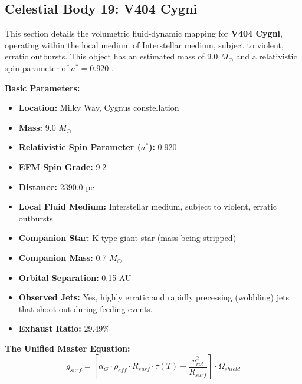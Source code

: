 \documentclass[11pt, a4paper]{article}
\begin{document}
\clearpage
\subsection{Celestial Body 19: V404 Cygni}
This section details the volumetric fluid-dynamic mapping for \textbf{V404 Cygni}, operating within the local medium of Interstellar medium, subject to violent, erratic outbursts. This object has an estimated mass of 9.0 $M_{\odot}$ and a relativistic spin parameter of $a^* = 0.920$ \cite{miller-jones2015, simbad}.

\vspace{0.5em}
\noindent \textbf{Basic Parameters:}
\begin{itemize}
  \item \textbf{Location:} Milky Way, Cygnus constellation
  \item \textbf{Mass:} 9.0 $M_{\odot}$
  \item \textbf{Relativistic Spin Parameter ($a^*$):} 0.920
  \item \textbf{EFM Spin Grade:} 9.2
  \item \textbf{Distance:} 2390.0 pc
  \item \textbf{Local Fluid Medium:} Interstellar medium, subject to violent, erratic outbursts
  \item \textbf{Companion Star:} K-type giant star (mass being stripped)
  \item \textbf{Companion Mass:} 0.7 $M_{\odot}$
  \item \textbf{Orbital Separation:} 0.15 AU
  \item \textbf{Observed Jets:} Yes, highly erratic and rapidly precessing (wobbling) jets that shoot out during feeding events.
  \item \textbf{Exhaust Ratio:} 29.49\%
\end{itemize}

\vspace{0.5em}
\noindent \textbf{The Unified Master Equation:}
$$ g_{surf} = \left[ \alpha_G \cdot \rho_{eff} \cdot R_{surf} \cdot \tau(T) - \frac{v_{rot}^2}{R_{surf}} \right] \cdot \Omega_{shield} $$
\end{document}
